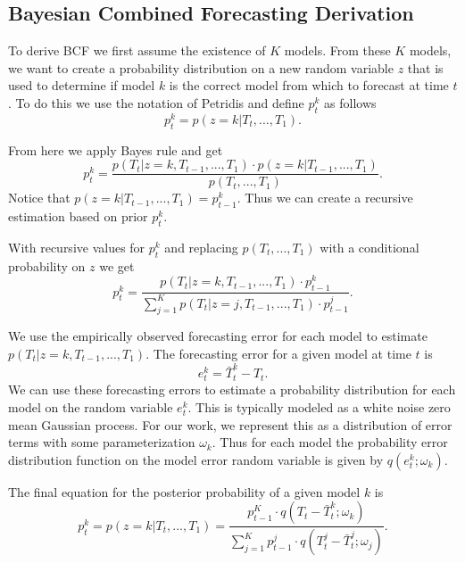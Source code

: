 \documentclass{acm_proc_article-sp}
\begin{document}
\subsection{Bayesian Combined Forecasting Derivation}
To derive BCF we first assume the existence of $K$ models.  From these $K$ models, we want to create a probability distribution on a new random variable $z$ that is used to determine if model $k$ is the correct model from which to forecast at time $t$.  To do this we use the notation of Petridis \cite{Petridis2001} and define $p_{t}^{k}$ as follows
\begin{equation}
p_{t}^{k} = p(z = k | T_{t}, ..., T_{1}).
\end{equation}

From here we apply Bayes rule and get
\begin{equation}
p_{t}^{k} = \frac{p(T_{t} | z = k, T_{t - 1}, ..., T_{1}) \cdot p(z = k | T_{t - 1}, ..., T_{1})} {p(T_{t}, ..., T_{1})}.
\end{equation}
\noindent
Notice that $p(z = k | T_{t - 1}, ..., T_{1}) = p_{t - 1}^{k}$.  Thus we can create a recursive estimation based on prior $p_{t}^{k}$.

With recursive values for $p_{t}^{k}$ and replacing $p(T_{t}, ..., T_{1})$ with a conditional probability on $z$ we get
\begin{equation}
p_{t}^{k} = \frac{p(T_{t} | z = k, T_{t - 1}, ..., T_{1}) \cdot p_{t - 1}^{k}} {\sum_{j = 1}^{K}p(T_{t} | z = j, T_{t - 1}, ..., T_{1}) \cdot p_{t - 1}^{j}}.
\end{equation}

We use the empirically observed forecasting error for each model to estimate $p(T_{t}|z = k, T_{t - 1}, ..., T_{1})$.  The forecasting error for a given model at time $t$ is 
\begin{equation}
e_{t}^{k} = \bar{T}_{t}^{k} - T_{t}.
\end{equation}
\noindent
We can use these forecasting errors to estimate a probability distribution for each model on the random variable $e_{t}^{k}$.  This is typically modeled as a white noise zero mean Gaussian process.  For our work, we represent this as a distribution of error terms with some parameterization $\omega_{k}$.  Thus for each model the probability error distribution function on the model error random variable is given by $q(e_{t}^{k};\omega_{k})$.

The final equation for the posterior probability of a given model $k$ is
\begin{equation}
\label{eq:model_prob}
p_{t}^{k} = p(z = k|T_{t}, ..., T_{1}) = \frac{p_{t - 1}^{K} \cdot q(T_{t} - \bar{T}_{t}^{k}; \omega_{k})}{\sum_{j=1}^{K}p_{t - 1}^{j} \cdot q(T_{t}^{j} - \bar{T}_{t}^{j}; \omega_{j})}.
\end{equation}
\end{document}
